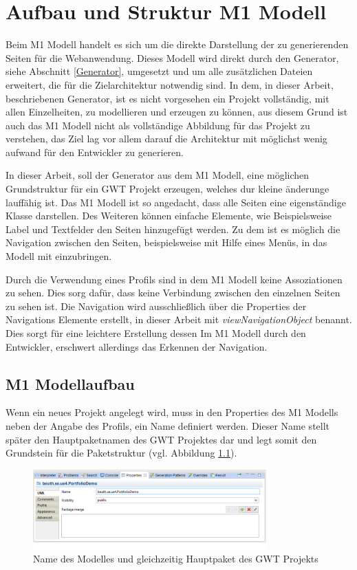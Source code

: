 \chapter{Aufbau und Struktur M1 Modell} \label{M1Modell}
Beim M1 Modell handelt es sich um die direkte Darstellung der zu generierenden
Seiten für die Webanwendung. Dieses Modell wird direkt durch den Generator,
siehe Abschnitt \ref{Generator}, umgesetzt und um alle zusätzlichen Dateien
erweitert, die für die Zielarchitektur notwendig sind. In dem, in dieser Arbeit,
beschriebenen Generator, ist es nicht vorgesehen ein Projekt vollständig, mit
allen Einzelheiten, zu modellieren und erzeugen zu können, aus diesem Grund ist
auch das M1 Modell nicht als vollständige Abbildung für das Projekt zu
verstehen, das Ziel lag vor allem darauf die Architektur mit möglichst wenig
aufwand für den Entwickler zu generieren.

In dieser Arbeit, soll der Generator aus dem M1 Modell, eine möglichen
Grundstruktur für ein GWT Projekt erzeugen, welches dur kleine änderunge
lauffähig ist. Das M1 Modell ist so angedacht, dass alle Seiten eine
eigenständige Klasse darstellen. Des Weiteren können einfache Elemente, wie
Beispielsweise Label und Textfelder den Seiten hinzugefügt werden.
Zu dem ist es möglich die Navigation zwischen den Seiten, beispielsweise mit
Hilfe eines Menüs, in das Modell mit einzubringen. 

Durch die Verwendung eines Profils sind in dem M1 Modell keine Assoziationen
zu sehen. Dies sorg dafür, dass keine Verbindung zwischen den einzelnen Seiten
zu sehen ist. Die Navigation wird ausschließlich über die Properties der
Navigations Elemente erstellt, in dieser Arbeit mit
\textit{viewNavigationObject} benannt. Dies sorgt für eine leichtere Erstellung
dessen Im M1 Modell durch den Entwickler, erschwert allerdings das Erkennen
der Navigation.

\section{M1 Modellaufbau}
Wenn ein neues Projekt angelegt wird, muss in den Properties des M1 Modells
neben der Angabe des Profils, ein Name definiert werden. Dieser Name stellt
später den Hauptpaketnamen des GWT Projektes dar und legt somit den Grundstein
für die Paketstruktur (vgl. Abbildung \ref{Fig:mainpackage}).

\begin{figure}[htbp]
\begin{center}
\includegraphics[width=0.8\textwidth]{./img/ProjectPackage.png}
\caption{Name des Modelles und gleichzeitig Hauptpaket des
GWT Projekts}\label{Fig:mainpackage}
\end{center}
\end{figure}

